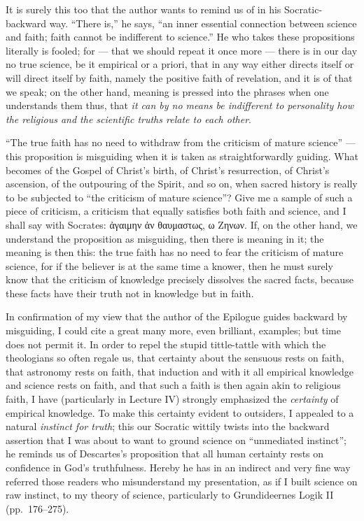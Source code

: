 \documentclass[12pt]{book}
\newcommand{\opage}[1]{\marginnote{\footnotesize\textit{[#1]}}}
\begin{document}
It is surely this too that the author wants to remind us of in his
Socratic-backward way. ``There is,'' he says, ``an inner essential
connection between science and faith; faith cannot be indifferent to
science.'' He who takes these propositions literally is fooled; for ---
that we should repeat it once more --- there is in our day no true
science, be it empirical or a priori, that in any way either directs
itself or will direct itself by faith, namely the positive faith of
revelation, and it is of that we speak; on the other hand, meaning is
pressed into the phrases when one understands them thus, that \emph{it
can by no means be indifferent to personality how the religious and the
scientific truths relate to each other}.

``The true faith has no need to withdraw from the criticism of mature
science'' --- this proposition is misguiding when it is taken as
straightforwardly guiding. What becomes of the Gospel of Christ's birth,
of Christ's resurrection, of Christ's ascension, of the outpouring of the
Spirit, and so on, when sacred history is really to be subjected to ``the
criticism of mature science''? Give me a sample of such a piece of
criticism, a criticism that equally satisfies both faith and science, and
I shall say with Socrates: ἀγαιμην ἀν θαυμαστως,
ω Ζηνων. If, on the other hand, we understand the proposition as
misguiding,
\opage{321}\setcounter{footnote}{0}%
then there is meaning in it; the meaning is then this: the true faith has
no need to fear the criticism of mature science, for if the believer is
at the same time a knower, then he must surely know that the criticism of
knowledge precisely dissolves the sacred facts, because these facts have
their truth not in knowledge but in faith.

In confirmation of my view that the author of the Epilogue guides
backward by misguiding, I could cite a great many more, even brilliant,
examples; but time does not permit it. In order to repel the stupid
tittle-tattle with which the theologians so often regale us, that
certainty about the sensuous rests on faith, that astronomy rests on
faith, that induction and with it all empirical knowledge and science
rests on faith, and that such a faith is then again akin to religious
faith, I have (particularly in Lecture IV) strongly emphasized the
\emph{certainty} of empirical knowledge. To make this certainty evident to
outsiders, I appealed to a natural \emph{instinct for truth}; this our
Socratic wittily twists into the backward assertion that I was about to
want to ground science on ``unmediated instinct''; he reminds us of
Descartes's proposition that all human certainty rests on confidence in
God's truthfulness. Hereby he has in an indirect and very fine way
referred those readers who misunderstand my presentation, as if I built
science on raw instinct, to my theory of science, particularly to
Grundideernes Logik II (pp.~176--275).
\end{document}
